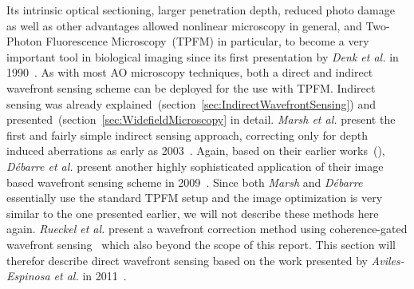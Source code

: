 Its intrinsic optical sectioning, larger penetration depth, reduced photo damage as well as other advantages allowed nonlinear microscopy in general, and Two-Photon Fluorescence Microscopy~(TPFM) in particular, to become a very important tool in biological imaging since its first presentation by \emph{Denk et al.} in 1990~\cite{scan_TPFM_principle}. As with most AO microscopy techniques, both a direct and indirect wavefront sensing scheme can be deployed for the use with TPFM. Indirect sensing was already explained~(section~\ref{sec:IndirectWavefrontSensing}) and presented~(section~\ref{sec:WidefieldMicroscopy} in detail. \emph{Marsh et al.} present the first and fairly simple indirect sensing approach, correcting only for depth induced aberrations as early as 2003~\cite{scan_TPFM_pratical}. Again, based on their earlier works~(\cite{wide_AOM_loew_freq,wide_AOM_structured_illu}), \emph{D\'{e}barre et al.} present another highly sophisticated application of their image based wavefront sensing scheme in 2009~\cite{scan_TPFM_image_based}. Since both \emph{Marsh} and \emph{D\'{e}barre} essentially use the standard TPFM setup and the image optimization is very similar to the one presented earlier, we will not describe these methods here again. \emph{Rueckel et al.} present a wavefront correction method using coherence-gated wavefront sensing~\cite{scan_TPFM_gated_wavefront} which also beyond the scope of this report. This section will therefor describe direct wavefront sensing based on the work presented by \emph{Aviles-Espinosa et al.} in 2011~\cite{scan_TPFM_guide_start}.\newline

